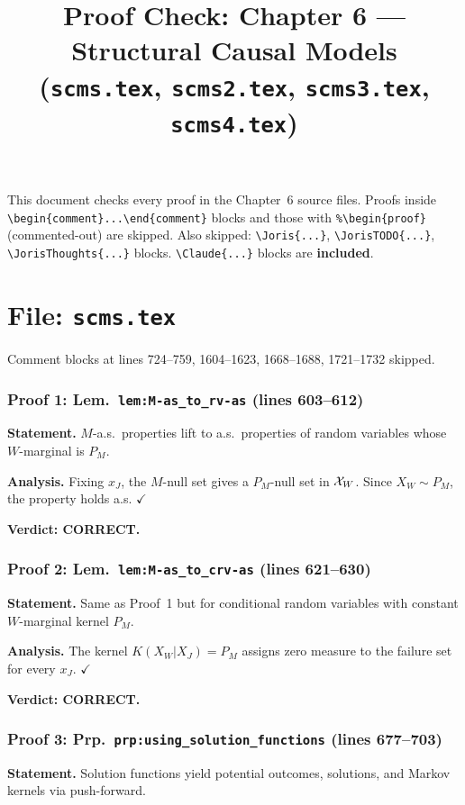 \documentclass{article}
\title{Proof Check: Chapter 6 --- Structural Causal Models\\
(\texttt{scms.tex}, \texttt{scms2.tex}, \texttt{scms3.tex}, \texttt{scms4.tex})}
\date{}
\begin{document}
\maketitle

This document checks every proof in the Chapter~6 source files.
Proofs inside \verb|\begin{comment}...\end{comment}| blocks and
those with \verb|%\begin{proof}| (commented-out) are skipped.
Also skipped: \verb|\Joris{...}|, \verb|\JorisTODO{...}|,
\verb|\JorisThoughts{...}| blocks.
\verb|\Claude{...}| blocks are \textbf{included}.

\part*{File: \texttt{scms.tex}}

Comment blocks at lines 724--759, 1604--1623, 1668--1688, 1721--1732 skipped.

\section{Proof 1: Lem.\ \texttt{lem:M-as\_to\_rv-as} (lines 603--612)}
\textbf{Statement.} $M$-a.s.\ properties lift to a.s.\ properties of random
variables whose $W$-marginal is $P_M$.

\textbf{Analysis.} Fixing $x_J$, the $M$-null set gives a $P_M$-null set in
$\mathcal{X}_W$.  Since $X_W\sim P_M$, the property holds a.s.  $\checkmark$

\textbf{Verdict: CORRECT.}

\section{Proof 2: Lem.\ \texttt{lem:M-as\_to\_crv-as} (lines 621--630)}
\textbf{Statement.} Same as Proof~1 but for conditional random variables with
constant $W$-marginal kernel $P_M$.

\textbf{Analysis.} The kernel $K(X_W|X_J)=P_M$ assigns zero measure to the
failure set for every $x_J$.  $\checkmark$

\textbf{Verdict: CORRECT.}

\section{Proof 3: Prp.\ \texttt{prp:using\_solution\_functions} (lines 677--703)}
\textbf{Statement.} Solution functions yield potential outcomes, solutions, and
Markov kernels via push-forward.
\end{document}
